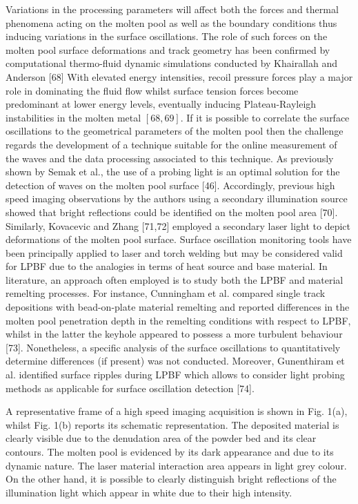 \documentclass[10pt]{article}
\begin{document}
Variations in the processing parameters will affect both the forces and thermal phenomena acting on the molten pool as well as the boundary conditions thus inducing variations in the surface oscillations. The role of such forces on the molten pool surface deformations and track geometry has been confirmed by computational thermo-fluid dynamic simulations conducted by Khairallah and Anderson [68] With elevated energy intensities, recoil pressure forces play a major role in dominating the fluid flow whilst surface tension forces become predominant at lower energy levels, eventually inducing Plateau-Rayleigh instabilities in the molten metal $[68,69]$. If it is possible to correlate the surface oscillations to the geometrical parameters of the molten pool then the challenge regards the development of a technique suitable for the online measurement of the waves and the data processing associated to this technique. As previously shown by Semak et al., the use of a probing light is an optimal solution for the detection of waves on the molten pool surface [46]. Accordingly, previous high speed imaging observations by the authors using a secondary illumination source showed that bright reflections could be identified on the molten pool area [70]. Similarly, Kovacevic and Zhang [71,72] employed a secondary laser light to depict deformations of the molten pool surface. Surface oscillation monitoring tools have been principally applied to laser and torch welding but may be considered valid for LPBF due to the analogies in terms of heat source and base material. In literature, an approach often employed is to study both the LPBF and material remelting processes. For instance, Cunningham et al. compared single track depositions with bead-on-plate material remelting and reported differences in the molten pool penetration depth in the remelting conditions with respect to LPBF, whilst in the latter the keyhole appeared to possess a more turbulent behaviour [73]. Nonetheless, a specific analysis of the surface oscillations to quantitatively determine differences (if present) was not conducted. Moreover, Gunenthiram et al. identified surface ripples during LPBF which allows to consider light probing methods as applicable for surface oscillation detection [74].

A representative frame of a high speed imaging acquisition is shown in Fig. 1(a), whilst Fig. 1(b) reports its schematic representation. The deposited material is clearly visible due to the denudation area of the powder bed and its clear contours. The molten pool is evidenced by its dark appearance and due to its dynamic nature. The laser material interaction area appears in light grey colour. On the other hand, it is possible to clearly distinguish bright reflections of the illumination light which appear in white due to their high intensity.
\end{document}
